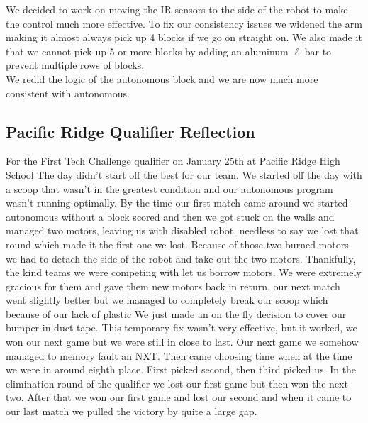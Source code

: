 We decided to work on moving the IR sensors to the side of the robot to make the control much more effective. To fix our consistency issues we widened the arm making it almost always pick up 4 blocks if we go on straight on. We also made it that we cannot pick up 5 or more blocks by adding an aluminum $\ell$ bar to prevent multiple rows of blocks. \\
We redid the logic of the autonomous block and we are now much more consistent with autonomous. 

\newpage \subsection{Pacific Ridge Qualifier Reflection}
For the First Tech Challenge qualifier on January 25th at Pacific Ridge High School The day didn’t start off the best for our team.  We started off the day with a scoop that wasn’t in the greatest condition and our autonomous program wasn’t running optimally.  By the time our first match came around we started autonomous without a block scored and then we got stuck on the walls and managed two motors, leaving us with disabled robot.  needless to say we lost that round which made it the first one we lost.  Because of those two burned motors we had to detach the side of the robot and take out the two motors. Thankfully, the kind teams we were competing with let us borrow motors.  We were extremely gracious for them and gave them new motors back in return.  our next match went slightly better but we managed to completely break our scoop which because of our lack of plastic We just made an on the fly decision to cover our bumper in duct tape.  This temporary fix wasn’t very effective, but it worked, we won our next game but we were still in close to last.  Our next game we somehow managed to memory fault an NXT.  Then came choosing time when at the time we were in around eighth place.  First picked second, then third picked us.  In the elimination round of the qualifier we lost our first game but then won the next two.  After that we won our first game and lost our second and when it came to our last match we pulled the victory by quite a large gap.

